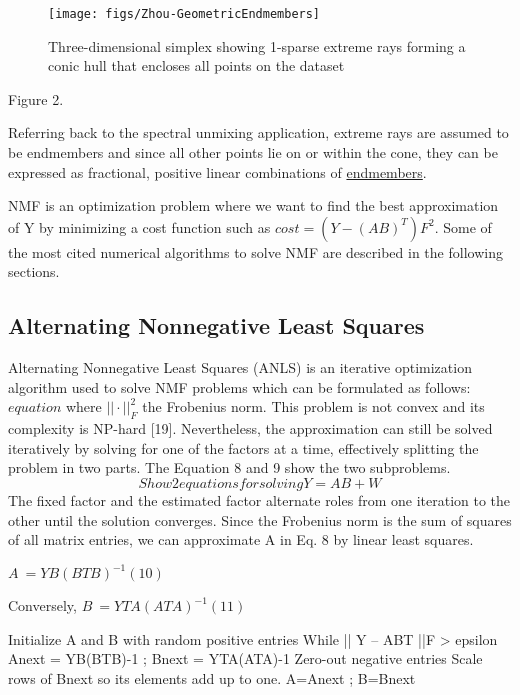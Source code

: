 \begin{figure}[ht]
	\begin{center}
		\texttt{[image: figs/Zhou-GeometricEndmembers]}
		\caption{Three-dimensional simplex showing 1-sparse extreme rays forming a conic hull that encloses all points on the dataset \cite{zhou_nonnegative_2014}}
		\label{fig:Zhou-GeometricEndmembers}
	\end{center}
\end{figure}
Figure 2. 

Referring back to the spectral unmixing application, extreme rays are assumed to be endmembers and since all other points lie on or within the cone, they can be expressed as fractional, positive linear combinations of \underline{endmembers}.

NMF is an optimization problem where we want to find the best approximation of Y by minimizing a cost function such as $ cost = (Y-(AB)^T )F^2. $ Some of the most cited numerical algorithms to solve NMF are described in the following sections.

\subsection{Alternating Nonnegative Least Squares}
Alternating Nonnegative Least Squares (ANLS) is an iterative optimization algorithm used to solve NMF problems which can be formulated as follows:
$ equation $
where $||\cdot||_F^2$ the Frobenius norm.  This problem is not convex and its complexity is NP-hard [19].  Nevertheless, the approximation can still be solved iteratively by solving for one of the factors at a time, effectively splitting the problem in two parts.  The Equation 8 and 9 show the two subproblems.\\
\begin{equation}
	Show 2 equations for solving Y=AB+W
\end{equation}
The fixed factor and the estimated factor alternate roles from one iteration to the other until the solution converges.  Since the Frobenius norm is the sum of squares of all matrix entries, we can approximate A in Eq. 8 by linear least squares.  

$
A ~= YB(BTB)^{-1}	(10)
$

Conversely,
$	B ~= YTA(ATA)^{-1}	(11) $

Initialize A and B with random positive entries
While || Y – ABT ||F > epsilon
Anext = YB(BTB)-1 ;   Bnext = YTA(ATA)-1
Zero-out negative entries
Scale rows of Bnext so its elements add up to one.
A=Anext ;  B=Bnext

